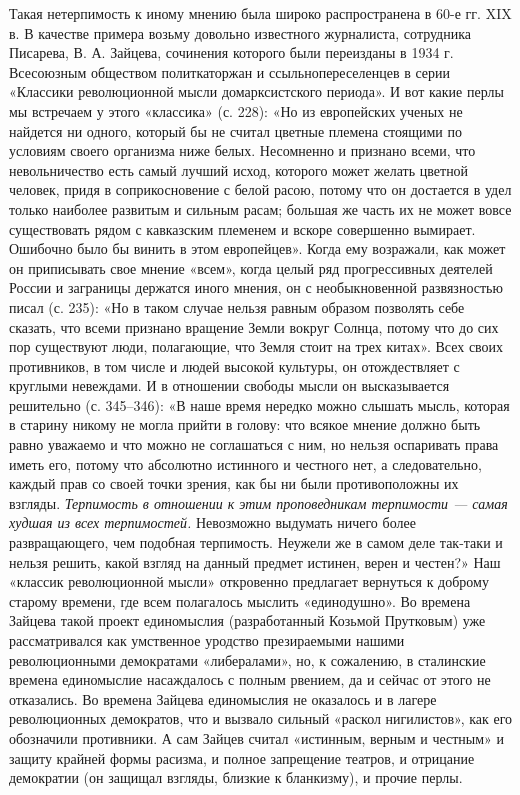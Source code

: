 Такая нетерпимость  к иному мнению  была широко распространена  в 60-е
гг. XIX в.  В качестве примера возьму  довольно известного журналиста,
сотрудника Писарева, В. А. Зайцева, сочинения которого были переизданы
в 1934  г. Всесоюзным обществом политкаторжан  и ссыльнопереселенцев в
серии «Классики  революционной мысли  домарксистского периода».  И вот
какие  перлы  мы  встречаем  у  этого  «классика»  (с.  228):  «Но  из
европейских  ученых  не  найдется  ни одного,  который  бы  не  считал
цветные  племена стоящими  по  условиям своего  организма ниже  белых.
Несомненно  и признано  всеми,  что невольничество  есть самый  лучший
исход, которого может желать  цветной человек, придя в соприкосновение
с белой расою, потому что он достается в удел только наиболее развитым
и  сильным расам;  большая же  часть  их не  может вовсе  существовать
рядом  с кавказским  племенем и  вскоре совершенно  вымирает. Ошибочно
было  бы винить  в этом  европейцев». Когда  ему возражали,  как может
он  приписывать  свое мнение  «всем»,  когда  целый ряд  прогрессивных
деятелей России и заграницы держатся иного мнения, он с необыкновенной
развязностью писал (с. 235): «Но  в таком случае нельзя равным образом
позволять  себе  сказать, что  всеми  признано  вращение Земли  вокруг
Солнца, потому что  до сих пор существуют люди,  полагающие, что Земля
стоит на  трех китах».  Всех своих  противников, в  том числе  и людей
высокой культуры, он отождествляет с круглыми невеждами. И в отношении
свободы мысли он высказывается решительно (с. 345--346): «В наше время
нередко можно слышать мысль, которая  в старину никому не могла прийти
в голову: что всякое мнение должно  быть равно уважаемо и что можно не
соглашаться  с  ним, но  нельзя  оспаривать  права иметь  его,  потому
что  абсолютно  истинного  и  честного нет,  а  следовательно,  каждый
прав  со  своей  точки  зрения,  как  бы  ни  были  противоположны  их
взгляды. \emph{Терпимость в отношении  к этим проповедникам терпимости
---  самая худшая  из  всех терпимостей.}  Невозможно выдумать  ничего
более  развращающего,  чем подобная  терпимость.  Неужели  же в  самом
деле  так-таки  и  нельзя  решить,  какой  взгляд  на  данный  предмет
истинен, верен и честен?» Наш «классик революционной мысли» откровенно
предлагает вернуться  к доброму  старому времени, где  всем полагалось
мыслить  «единодушно». Во  времена  Зайцева  такой проект  единомыслия
(разработанный  Козьмой Прутковым)  уже рассматривался  как умственное
уродство презираемыми нашими  революционными демократами «либералами»,
но, к сожалению, в сталинские времена единомыслие насаждалось с полным
рвением,  да и  сейчас  от  этого не  отказались.  Во времена  Зайцева
единомыслия не  оказалось и в  лагере революционных демократов,  что и
вызвало сильный «раскол нигилистов»,  как его обозначили противники. А
сам Зайцев считал «истинным, верным  и честным» и защиту крайней формы
расизма,  и  полное запрещение  театров,  и  отрицание демократии  (он
защищал взгляды, близкие к бланкизму), и прочие перлы.


